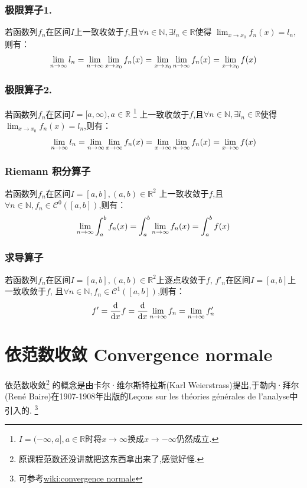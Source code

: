 \documentclass[12pt, a4paper, oneside]{ctexbook}
\newcommand{\R }{\mathbb{R}}%
\newcommand{\C }{\mathcal{C}}%
\begin{document}
  \subsubsection{极限算子1.}
  若函数列$f_n$在区间$I$上一致收敛于$f$,且$\forall n\in\mathbb{N}, \exists l_n\in\R$使得
  $\lim_{x \to x_0}f_n(x)=l_n$,则有：
  \begin{equation}
    \notag
    \lim_{n \to \infty}l_n= \lim_{n \to \infty}\lim_{x \to x_0}f_n(x)
    =\lim_{x \to x_0}\lim_{n \to \infty}f_n(x)=\lim_{x \to x_0}f(x)   
  \end{equation}
  \subsubsection{极限算子2.}
  若函数列$f_n$在区间$I=[a,\infty), a\in\R$
    \footnote{$I=(-\infty,a], a\in\R$时将$x \to \infty$换成$x \to -\infty$仍然成立.}
  上一致收敛于$f$,且$\forall n\in\mathbb{N}, \exists l_n\in\R$使得
  $\lim_{x \to x_0}f_n(x)=l_n$,则有：
  \begin{equation}
    \notag
    \lim_{n \to \infty}l_n= \lim_{n \to \infty}\lim_{x \to \infty}f_n(x)
    =\lim_{x \to \infty}\lim_{n \to \infty}f_n(x)=\lim_{x \to \infty}f(x)   
  \end{equation}
  \subsubsection{Riemann 积分算子}
  若函数列$f_n$在区间$I=[a,b], (a,b)\in\R^2$
  上一致收敛于$f$,且$\forall n\in\mathbb{N}, f_n\in\C ^0([a,b])$,则有：
  \begin{equation}
    \notag
    \lim_{n \to \infty}\int_{a}^{b} f_n(x)
    =\int_{a}^{b} \lim_{n \to \infty}f_n(x)=\int_{a}^{b} f(x)   
  \end{equation}
  \subsubsection{求导算子}
  若函数列$f_n$在区间$I=[a,b], (a,b)\in\R^2$上逐点收敛于$f$,
  $f'_n$在区间$I=[a,b]$上一致收敛于$f$,
  且$\forall n\in\mathbb{N}, f_n\in\mathcal{C} ^1([a,b])$,则有：
  \begin{equation}
    \notag
    f'=\frac{\mathrm{d} }{\mathrm{d} x}f
    =\frac{\mathrm{d} }{\mathrm{d} x} \lim_{n \to \infty} f_n
    =\lim_{n \to \infty}f'_n  
  \end{equation}



\section{依范数收敛 Convergence normale}
  依范数收敛\footnote{原课程范数还没讲就把这东西拿出来了,感觉好怪.}%
  的概念是由卡尔·维尔斯特拉斯(Karl Weierstrass)提出,于勒内·拜尔(René Baire)在1907-1908年出版的Leçons sur les théories générales de l'analyse中引入的.
  \footnote{可参考\href{https://fr.wikipedia.org/wiki/Convergence_normale}{wiki:convergence normale}}\\
\end{document}
